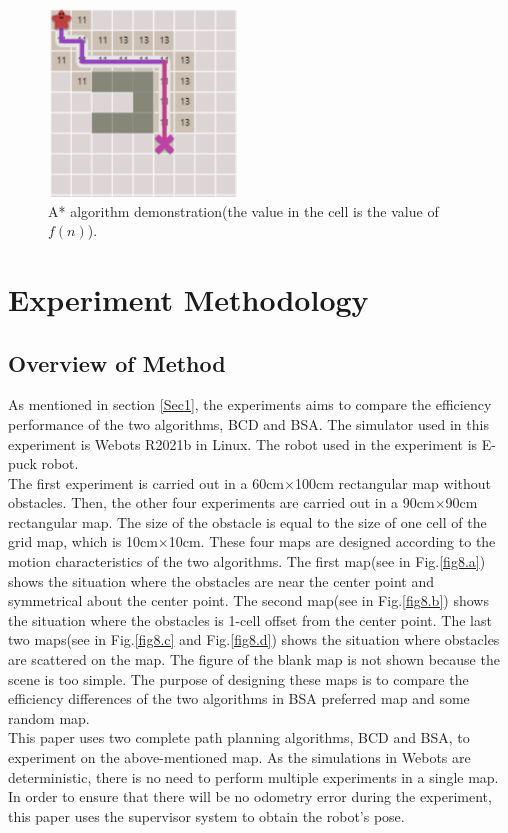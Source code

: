 \documentclass[conference]{IEEEtran}
\begin{document}
\setlength{\belowcaptionskip}{-1cm}
\begin{figure}[htbp]
\centerline{\includegraphics[width=5cm,height=5cm]{RS_Report/astar.png}}
\caption{A* algorithm demonstration(the value in the cell is the value of $f(n)$).}
\label{fig4}
\end{figure}



\section{Experiment Methodology}

\subsection{Overview of Method}
As mentioned in section \ref{Sec1}, the experiments aims to compare the efficiency performance of the two algorithms, BCD and BSA. The simulator used in this experiment is Webots R2021b in Linux. The robot used in the experiment is E-puck robot\cite{Cyberboticswebsite}.\\
The first experiment is carried out in a 60cm$\times$100cm rectangular map without obstacles. Then, the other four experiments are carried out in a 90cm$\times$90cm rectangular map. The size of the obstacle is equal to the size of one cell of the grid map, which is 10cm$\times$10cm. These four maps are designed according to the motion characteristics of the two algorithms. The first map(see in Fig.\ref{fig8.a}) shows the situation where the obstacles are near the center point and symmetrical about the center point. The second map(see in Fig.\ref{fig8.b}) shows the situation where the obstacles is 1-cell offset from the center point. The last two maps(see in Fig.\ref{fig8.c} and Fig.\ref{fig8.d}) shows the situation where obstacles are scattered on the map. The figure of the blank map is not shown because the scene is too simple. The purpose of designing these maps is to compare the efficiency differences of the two algorithms in BSA preferred map and some random map.\\
This paper uses two complete path planning algorithms, BCD and BSA, to experiment on the above-mentioned map. As the simulations in Webots are deterministic, there is no need to perform multiple experiments in a single map. In order to ensure that there will be no odometry error during the experiment, this paper uses the supervisor system to obtain the robot's pose. 
\end{document}
